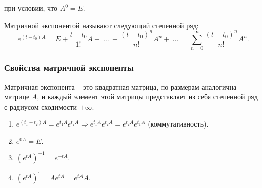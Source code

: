при условии, что $A^0 = E.$

\begin{definition}
	Матричной экспонентой называют следующий степенной ряд:
	\begin{equation*}
		e^{(t-t_0)A} = E + \frac{t-t_0}{1!}A +\ \dots\ + \frac{(t-t_0)^n}{n!}A^n+\ \dots\ = \sum\limits_{n = 0}^{\infty} \frac{(t-t_0)^n}{n!}A^n.
	\end{equation*}
\end{definition}

\subsubsection{Свойства матричной экспоненты}

Матричная экспонента -- это квадратная матрица, по размерам аналогична матрице $A$, и каждый элемент этой матрицы представляет из себя степенной ряд с радиусом сходимости $+\infty$.

\begin{enumerate}
	\item $e^{(t_1+t_2)A} = e^{t_1A}e^{t_2A} \Rightarrow e^{t_1A}e^{t_2A} = e^{t_2A}e^{t_1A}$ (коммутативность).
		
	\item $ e^{0 A} = E.$	
	
	\item $\left(e^{tA}\right)^{-1} = e^{-tA}.$
		
	\item $(e^{tA})^{'} = A e^{tA} = e^{tA}A.$

\end{enumerate}


